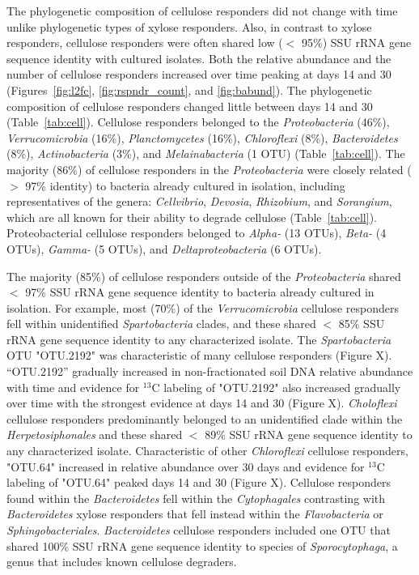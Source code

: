 The phylogenetic composition of cellulose responders did not change with time
unlike phylogenetic types of xylose responders. Also, in contrast to xylose
responders, cellulose responders were often shared low ($<$ 95\%) SSU rRNA gene
sequence identity with cultured isolates. Both the relative abundance and the
number of cellulose responders increased over time peaking at days 14 and 30
(Figures~\ref{fig:l2fc}, \ref{fig:rspndr_count}, and \ref{fig:babund}). The
phylogenetic composition of cellulose responders changed little between days
14 and 30 (Table~\ref{tab:cell}). Cellulose responders belonged to the
\textit{Proteobacteria} (46\%), \textit{Verrucomicrobia} (16\%),
\textit{Planctomycetes} (16\%), \textit{Chloroflexi} (8\%),
\textit{Bacteroidetes} (8\%), \textit{Actinobacteria} (3\%), and
\textit{Melainabacteria} (1 OTU) (Table~\ref{tab:cell}). The majority (86\%)
of cellulose responders in the \textit{Proteobacteria} were closely related
($>$ 97\% identity) to bacteria already cultured in isolation, including
representatives of the genera: \textit{Cellvibrio}, \textit{Devosia},
\textit{Rhizobium}, and \textit{Sorangium}, which are all known for their
ability to degrade cellulose (Table~\ref{tab:cell}). Proteobacterial cellulose
responders belonged to \textit{Alpha-} (13 OTUs), \textit{Beta-} (4 OTUs),
\textit{Gamma-} (5 OTUs), and \textit{Deltaproteobacteria} (6 OTUs). 

The majority (85\%) of cellulose responders outside of the
\textit{Proteobacteria} shared  $<$ 97\% SSU rRNA gene sequence identity to
bacteria already cultured in isolation. For example, most (70\%) of the
\textit{Verrucomicrobia} cellulose responders fell within unidentified
\textit{Spartobacteria} clades, and these shared $<$ 85\% SSU rRNA gene
sequence identity to any characterized isolate. The \textit{Spartobacteria} OTU
"OTU.2192" was characteristic of many cellulose responders (Figure X).
``OTU.2192'' gradually increased in non-fractionated soil DNA relative
abundance with time and evidence for $^{13}$C labeling of "OTU.2192" also
increased gradually over time with the strongest evidence at days 14 and
30 (Figure X). \textit{Choloflexi} cellulose responders predominantly belonged
to an unidentified clade within the \textit{Herpetosiphonales} and these
shared $<$ 89\% SSU rRNA gene sequence identity to any characterized
isolate. Characteristic of other \textit{Chloroflexi} cellulose responders,
"OTU.64" increased in relative abundance over 30 days and evidence for
$^{13}$C labeling of "OTU.64" peaked days 14 and 30 (Figure X). Cellulose
responders found within the \textit{Bacteroidetes} fell within the
\textit{Cytophagales} contrasting with \textit{Bacteroidetes} xylose
responders that fell instead within the \textit{Flavobacteria} or
\textit{Sphingobacteriales}. \textit{Bacteroidetes} cellulose responders
included one OTU that shared 100\% SSU rRNA gene sequence identity to
species of \textit{Sporocytophaga}, a genus that includes known cellulose
degraders.

